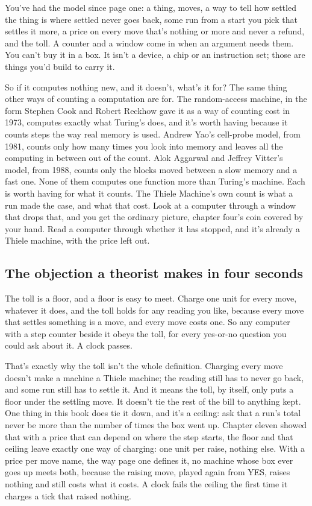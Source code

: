 \documentclass[11pt,twoside]{article}
\theoremstyle{thielethm}
\theoremstyle{thieledef}
\theoremstyle{thieledef}
\theoremstyle{thieledef}
\theoremstyle{thielethm}
\theoremstyle{thieleobs}
\theoremstyle{thielethm}
\begin{document}
You've had the model since page one: a thing, moves, a way to tell how settled the thing is where settled never goes back, some run from a start you pick that settles it more, a price on every move that's nothing or more and never a refund, and the toll. A counter and a window come in when an argument needs them. You can't buy it in a box. It isn't a device, a chip or an instruction set; those are things you'd build to carry it.

So if it computes nothing new, and it doesn't, what's it for? The same thing other ways of counting a computation are for. The random-access machine, in the form Stephen Cook and Robert Reckhow gave it as a way of counting cost in 1973, computes exactly what Turing's does, and it's worth having because it counts steps the way real memory is used. Andrew Yao's cell-probe model, from 1981, counts only how many times you look into memory and leaves all the computing in between out of the count. Alok Aggarwal and Jeffrey Vitter's model, from 1988, counts only the blocks moved between a slow memory and a fast one. None of them computes one function more than Turing's machine. Each is worth having for what it counts. The Thiele Machine's own count is what a run made the case, and what that cost. Look at a computer through a window that drops that, and you get the ordinary picture, chapter four's coin covered by your hand. Read a computer through whether it has stopped, and it's already a Thiele machine, with the price left out.

\subsection{The objection a theorist makes in four seconds}

The toll is a floor, and a floor is easy to meet. Charge one unit for every move, whatever it does, and the toll holds for any reading you like, because every move that settles something is a move, and every move costs one. So any computer with a step counter beside it obeys the toll, for every yes-or-no question you could ask about it. A clock passes.

That's exactly why the toll isn't the whole definition. Charging every move doesn't make a machine a Thiele machine; the reading still has to never go back, and some run still has to settle it. And it means the toll, by itself, only puts a floor under the settling move. It doesn't tie the rest of the bill to anything kept. One thing in this book does tie it down, and it's a ceiling: ask that a run's total never be more than the number of times the box went up. Chapter eleven showed that with a price that can depend on where the step starts, the floor and that ceiling leave exactly one way of charging: one unit per raise, nothing else. With a price per move name, the way page one defines it, no machine whose box ever goes up meets both, because the raising move, played again from YES, raises nothing and still costs what it costs. A clock fails the ceiling the first time it charges a tick that raised nothing.
\end{document}
